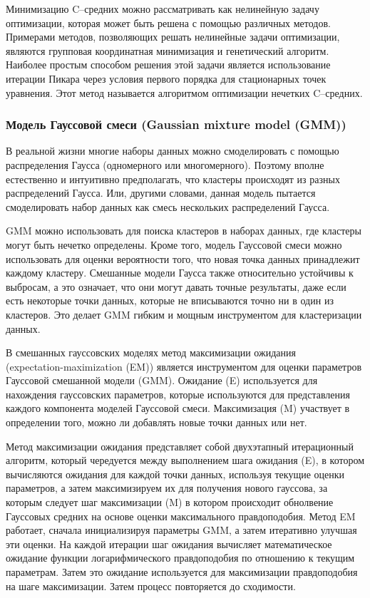 Минимизацию C–средних можно рассматривать как нелинейную задачу оптимизации, которая может быть
решена с помощью различных методов. Примерами методов, позволяющих решать нелинейные задачи оптимизации, являются групповая координатная минимизация и генетический алгоритм. Наиболее простым способом решения этой задачи является использование итерации Пикара через условия первого порядка для стационарных точек уравнения. Этот метод называется алгоритмом оптимизации нечетких C–средних. \cite{FuzzySurvey}

\subsubsection{Модель Гауссовой смеси (Gaussian mixture model (GMM))}

В реальной жизни многие наборы данных можно смоделировать с помощью распределения Гаусса (одномерного или многомерного). Поэтому вполне естественно и интуитивно предполагать, что кластеры происходят из разных распределений Гаусса. Или, другими словами, данная модель пытается смоделировать набор данных как смесь нескольких распределений Гаусса.

GMM можно использовать для поиска кластеров в наборах данных, где кластеры могут быть нечетко определены. Кроме того, модель Гауссовой смеси можно использовать для оценки вероятности того, что новая точка данных принадлежит каждому кластеру. Смешанные модели Гаусса также относительно устойчивы к выбросам, а это означает, что они могут давать точные результаты, даже если есть некоторые точки данных, которые не вписываются точно ни в один из кластеров. Это делает GMM гибким и мощным инструментом для кластеризации данных.

В смешанных гауссовских моделях метод максимизации ожидания\\(expectation-maximization (EM)) является инструментом для оценки параметров Гауссовой смешанной модели (GMM). Ожидание (E) используется для нахождения гауссовских параметров, которые используются для представления каждого компонента моделей Гауссовой смеси. Максимизация (M) участвует в определении того, можно ли добавлять новые точки данных или нет.

Метод максимизации ожидания  представляет собой двухэтапный итерационный алгоритм, который чередуется между выполнением шага ожидания (E), в котором вычисляются ожидания для каждой точки данных, используя текущие оценки параметров, а затем максимизируем их для получения нового гауссова, за которым следует шаг максимизации (M) в котором происходит обнолвение Гауссовых средних на основе оценки максимального правдоподобия. Метод EM работает, сначала инициализируя параметры GMM, а затем итеративно улучшая эти оценки. На каждой итерации шаг ожидания вычисляет математическое ожидание функции логарифмического правдоподобия по отношению к текущим параметрам. Затем это ожидание используется для максимизации правдоподобия на шаге максимизации. Затем процесс повторяется до сходимости.

